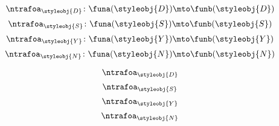 {\begin{forslides}
        \begin{equation}
            \label{eq:eq_nt_3}
            \ntrafoa_{\styleobj{D}}\colon \funa(\styleobj{D}) \mto \funb(\styleobj{D})
        \end{equation}
        \begin{equation}
            \label{eq:eq_nt_4}
            \ntrafoa_{\styleobj{S}}\colon \funa(\styleobj{S}) \mto \funb(\styleobj{S})
        \end{equation}
        \begin{equation}
            \label{eq:eq_nt_5}
            \ntrafoa_{\styleobj{Y}}\colon \funa(\styleobj{Y}) \mto \funb(\styleobj{Y})
        \end{equation}
        \begin{equation}
            \label{eq:eq_nt_6}
            \ntrafoa_{\styleobj{N}}\colon \funa(\styleobj{N}) \mto \funb(\styleobj{N})
        \end{equation}

        \begin{equation}
            \label{eq:eq_nt_3a}
            \ntrafoa_{\styleobj{D}}
        \end{equation}
        \begin{equation}
            \label{eq:eq_nt_4a}
            \ntrafoa_{\styleobj{S}}
        \end{equation}
        \begin{equation}
            \label{eq:eq_nt_5a}
            \ntrafoa_{\styleobj{Y}}
        \end{equation}
        \begin{equation}
            \label{eq:eq_nt_6a}
            \ntrafoa_{\styleobj{N}}
        \end{equation}



\end{forslides}}
